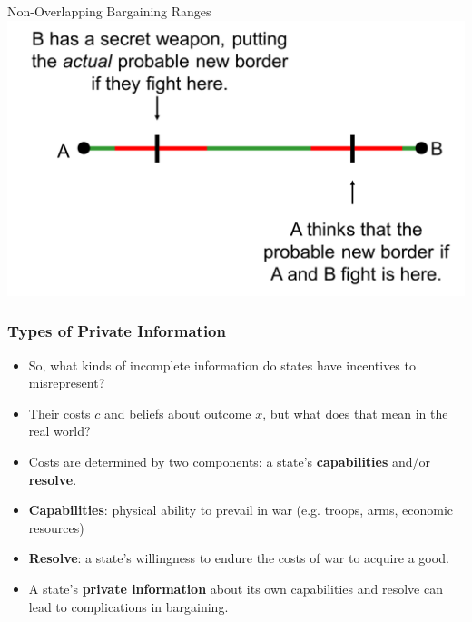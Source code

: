 \documentclass[handout]{beamer}
\begin{document}
\begin{frame}{Non-Overlapping Bargaining Ranges}
	\centering
	\includegraphics[width=\textwidth,height=0.8\textheight,keepaspectratio]{Bluff3.png}
\end{frame}

\begin{frame} 
	\frametitle{\LARGE{Types of Private Information}}
	\begin{itemize}
		\item So, what kinds of incomplete information do states have incentives to misrepresent? \pause
		\item Their costs $c$ and beliefs about outcome $x$, but what does that mean in the real world? \pause
		\item Costs are determined by two components: a state's \textbf{capabilities} and/or \textbf{resolve}. \pause
		\item \textbf{Capabilities}: physical ability to prevail in war (e.g. troops, arms, economic resources) \pause
		\item \textbf{Resolve}: a state's willingness to endure the costs of war to acquire a good. \pause 
		\item A state's \textbf{private information} about its own capabilities and resolve can lead to complications in bargaining.
	\end{itemize}
\end{frame}
\end{document}
